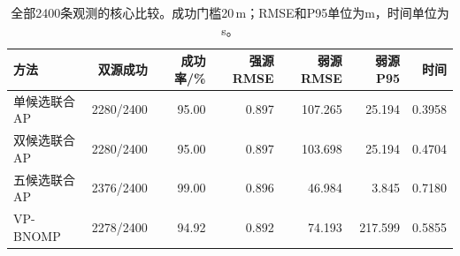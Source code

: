 \begin{table}[H]\centering\small
\caption{全部2400条观测的核心比较。成功门槛20\,m；RMSE和P95单位为m，时间单位为s。}\label{tab:formalcore}
\begin{tabular}{@{}lrrrrrr@{}}\toprule
方法 & 双源成功 & 成功率/\% & 强源RMSE & 弱源RMSE & 弱源P95 & 时间\\\midrule
单候选联合AP & 2280/2400 & 95.00 & 0.897 & 107.265 & 25.194 & 0.3958\\
双候选联合AP & 2280/2400 & 95.00 & 0.897 & 103.698 & 25.194 & 0.4704\\
五候选联合AP & 2376/2400 & 99.00 & 0.896 & 46.984 & 3.845 & 0.7180\\
VP-BNOMP & 2278/2400 & 94.92 & 0.892 & 74.193 & 217.599 & 0.5855\\
\bottomrule\end{tabular}\end{table}

